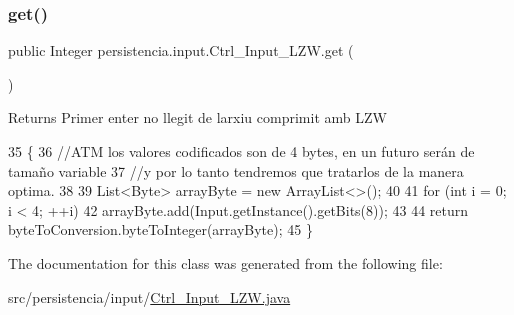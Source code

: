 \subsubsection{\texorpdfstring{get()}{get()}}
{\footnotesize\ttfamily public Integer persistencia.\+input.\+Ctrl\+\_\+\+Input\+\_\+\+L\+Z\+W.\+get (\begin{DoxyParamCaption}{ }\end{DoxyParamCaption})\hspace{0.3cm}{\ttfamily [inline]}}

\begin{DoxyReturn}{Returns}
Primer enter no llegit de l\textquotesingle{}arxiu comprimit amb L\+ZW 
\end{DoxyReturn}

\begin{DoxyCode}
35                          \{
36         \textcolor{comment}{//ATM los valores codificados son de 4 bytes, en un futuro serán de tamaño variable}
37         \textcolor{comment}{//y por lo tanto tendremos que tratarlos de la manera optima.}
38         
39         List<Byte> arrayByte = \textcolor{keyword}{new} ArrayList<>();
40 
41         \textcolor{keywordflow}{for} (\textcolor{keywordtype}{int} i = 0; i < 4; ++i) 
42             arrayByte.add(Input.getInstance().getBits(8));
43         
44         \textcolor{keywordflow}{return} byteToConversion.byteToInteger(arrayByte);
45     \}
\end{DoxyCode}


The documentation for this class was generated from the following file\+:\begin{DoxyCompactItemize}
\item 
src/persistencia/input/\hyperlink{Ctrl__Input__LZW_8java}{Ctrl\+\_\+\+Input\+\_\+\+L\+Z\+W.\+java}\end{DoxyCompactItemize}
